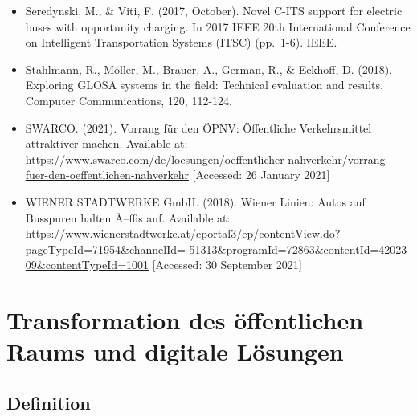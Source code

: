 \documentclass[
]{book}
\begin{document}
\begin{itemize}
\item
  Seredynski, M., \& Viti, F. (2017, October). Novel C-ITS support for electric buses with opportunity charging. In 2017 IEEE 20th International Conference on Intelligent Transportation Systems (ITSC) (pp.~1-6). IEEE.
\item
  Stahlmann, R., Möller, M., Brauer, A., German, R., \& Eckhoff, D. (2018). Exploring GLOSA systems in the field: Technical evaluation and results. Computer Communications, 120, 112-124.
\item
  SWARCO. (2021). Vorrang für den ÖPNV: Öffentliche Verkehrsmittel attraktiver machen. Available at: \url{https://www.swarco.com/de/loesungen/oeffentlicher-nahverkehr/vorrang-fuer-den-oeffentlichen-nahverkehr} {[}Accessed: 26 January 2021{]}
\item
  WIENER STADTWERKE GmbH. (2018). Wiener Linien: Autos auf Busspuren halten Ã--ffis auf. Available at: \url{https://www.wienerstadtwerke.at/eportal3/ep/contentView.do?pageTypeId=71954\&channelId=-51313\&programId=72863\&contentId=4202309\&contentTypeId=1001} {[}Accessed: 30 September 2021{]}
\end{itemize}

\hypertarget{transformation_public_space}{%
\section{Transformation des öffentlichen Raums und digitale Lösungen}\label{transformation_public_space}}

\hypertarget{definition-6}{%
\subsection*{Definition}\label{definition-6}}
\end{document}
